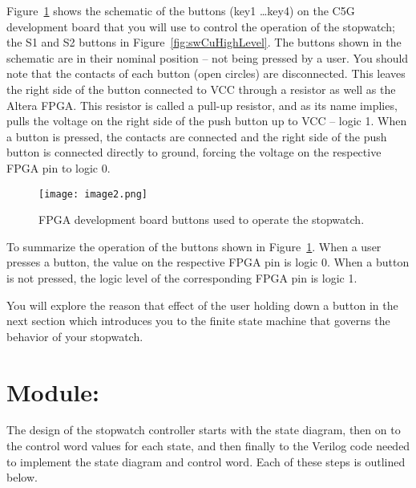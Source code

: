Figure~\ref{fig:swCuButtons} shows the schematic of the buttons (key1 \ldots key4) on the
C5G development board that you will use to control the operation of the
stopwatch; the S1 and S2 buttons in Figure~\ref{fig:swCuHighLevel}. The buttons shown in the
schematic are in their nominal position -- not being pressed by a user.
You should note that the contacts of each button (open circles) are
disconnected. This leaves the right side of the button connected to VCC
through a resistor as well as the Altera FPGA. This resistor is called a
pull-up resistor, and as its name implies, pulls the voltage on the
right side of the push button up to VCC -- logic 1. When a button is
pressed, the contacts are connected and the right side of the push
button is connected directly to ground, forcing the voltage on the
respective FPGA pin to logic 0.

\begin{figure}[ht]
    \texttt{[image: image2.png]}
    \caption{FPGA development board buttons used to operate the stopwatch.}
    \label{fig:swCuButtons}
\end{figure}

To summarize the operation of the buttons shown in Figure~\ref{fig:swCuButtons}. When a user
presses a button, the value on the respective FPGA pin is logic 0. When
a button is not pressed, the logic level of the corresponding FPGA pin
is logic 1.

You will explore the reason that effect of the user holding down a
button in the next section which introduces you to the finite state
machine that governs the behavior of your stopwatch.

\section{Module: }
The design of the stopwatch controller starts with the state diagram, then
on to the control word values for each state, and then finally to the
Verilog code needed to implement the state diagram and control
word.  Each of these steps is outlined below.

